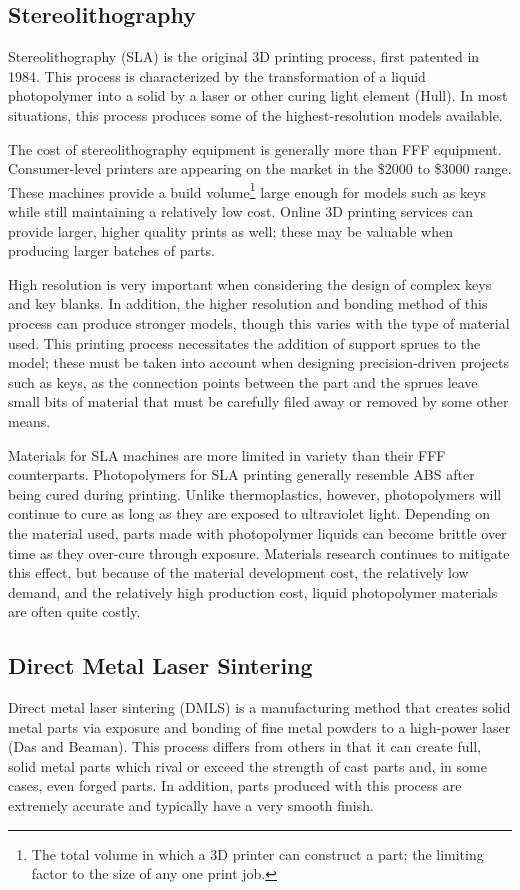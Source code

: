 \documentclass{acm_proc_article-sp}
\begin{document}
\subsection{Stereolithography}
Stereolithography (SLA) is the original 3D printing process, first patented in 1984. This process is characterized by the transformation of a liquid photopolymer into a solid by a laser or other curing light element (Hull). In most situations, this process produces some of the highest-resolution models available.

The cost of stereolithography equipment is generally more than FFF equipment. Consumer-level printers are appearing on the market in the \$2000 to \$3000 range. These machines provide a build volume\footnote{The total volume in which a 3D printer can construct a part; the limiting factor to the size of any one print job.} large enough for models such as keys while still maintaining a relatively low cost. Online 3D printing services can provide larger, higher quality prints as well; these may be valuable when producing larger batches of parts.

High resolution is very important when considering the design of complex keys and key blanks. In addition, the higher resolution and bonding method of this process can produce stronger models, though this varies with the type of material used. This printing process necessitates the addition of support sprues to the model; these must be taken into account when designing precision-driven projects such as keys, as the connection points between the part and the sprues leave small bits of material that must be carefully filed away or removed by some other means.

Materials for SLA machines are more limited in variety than their FFF counterparts. Photopolymers for SLA printing generally resemble ABS after being cured during printing. Unlike thermoplastics, however, photopolymers will continue to cure as long as they are exposed to ultraviolet light. Depending on the material used, parts made with photopolymer liquids can become brittle over time as they over-cure through exposure. Materials research continues to mitigate this effect, but because of the material development cost, the relatively low demand, and the relatively high production cost, liquid photopolymer materials are often quite costly. 

\subsection{Direct Metal Laser Sintering}
Direct metal laser sintering (DMLS) is a manufacturing method that creates solid metal parts via exposure and bonding of fine metal powders to a high-power laser (Das and Beaman). This process differs from others in that it can create full, solid metal parts which rival or exceed the strength of cast parts and, in some cases, even forged parts. In addition, parts produced with this process are extremely accurate and typically have a very smooth finish.
\end{document}
